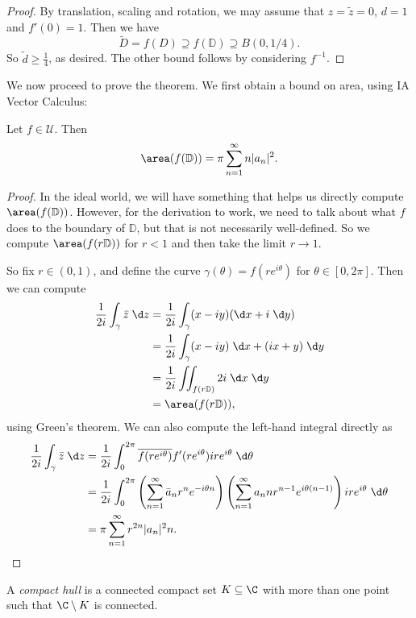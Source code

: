 \documentclass[a4paper]{article}
\renewcommand\D{\mathbb{D}}
\begin{document}
\begin{proof}
  By translation, scaling and rotation, we may assume that $z = \tilde{z} = 0$, $d = 1$ and $f'(0) = 1$. Then we have
  \[
    \tilde{D} = f(D) \supseteq f(\D) \supseteq B(0, 1/4).
  \]
  So $\tilde{d} \geq \frac{1}{4}$, as desired. The other bound follows by considering $f^{-1}$.
\end{proof}
We now proceed to prove the theorem. We first obtain a bound on area, using IA Vector Calculus:
\begin{prop}
  Let $f \in \mathcal{U}$. Then
  \[
    \area(f(\D)) = \pi \sum_{n = 1}^\infty n |a_n|^2.
  \]
\end{prop}

\begin{proof}
  In the ideal world, we will have something that helps us directly compute $\area(f(\D))$. However, for the derivation to work, we need to talk about what $f$ does to the boundary of $\D$, but that is not necessarily well-defined. So we compute $\area(f(r\D))$ for $r < 1$ and then take the limit $r \to 1$.

  So fix $r \in (0, 1)$, and define the curve $\gamma(\theta) = f(re^{i\theta})$ for $\theta \in [0, 2\pi]$. Then we can compute
  \begin{align*}
    \frac{1}{2i} \int_\gamma \bar{z} \;\d z &= \frac{1}{2i} \int_\gamma (x - iy) (\d x + i\;\d y)\\
    &= \frac{1}{2i} \int_\gamma (x - iy) \;\d x + (ix + y)\;\d y\\
    &= \frac{1}{2i} \iint_{f(r\D)} 2i\;\d x\;\d y\\
    &= \area(f(r\D)),
  \end{align*}
  using Green's theorem. We can also compute the left-hand integral directly as
  \begin{align*}
    \frac{1}{2i} \int_\gamma \bar{z}\;\d z &= \frac{1}{2i} \int_0^{2\pi} \overline{f(re^{i\theta})} f'(re^{i\theta}) i re^{i\theta }\;\d \theta\\
    &= \frac{1}{2i} \int_0^{2\pi} \left(\sum_{n = 1}^\infty \bar{a}_n r^n e^{-i\theta n}\right) \left(\sum_{n = 1}^\infty a_n nr^{n - 1} e^{i\theta (n - 1)}\right) ir e^{i\theta}\;\d \theta\\
    &= \pi \sum_{n = 1}^\infty r^{2n} |a_n|^2 n.\qedhere
  \end{align*}
\end{proof}

\begin{defi}
  A \emph{compact hull} is a connected compact set $K \subseteq \C$ with more than one point such that $\C \setminus K$ is connected.
\end{defi}
\end{document}
